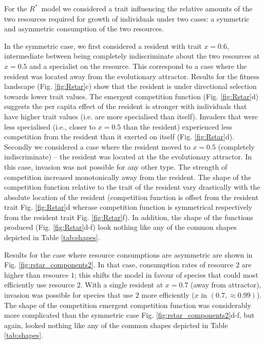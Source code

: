 \documentclass[a4paper,11pt]{article}
\newcommand{\Rstar}{\ensuremath{R^*}}
\begin{document}
For the \Rstar\ model we considered a trait influencing the relative amounts of the two resources required for growth of individuals under two cases: a symmetric and asymmetric consumption of the two resources.

In the symmetric case, we first considered a resident with trait $x = 0.6$, intermediate between being completely indiscriminate about the two resources at $x = 0.5$ and a specialist on the resource. This correspond to a case where the resident was located away from the evolutionary attractor. Results for the fitness landscape (Fig. \ref{fig:Rstar}c) show that the resident is under directional selection towards lower trait values. The emergent competition function (Fig. \ref{fig:Rstar}d) suggests the per capita effect of the resident is stronger with individuals that have higher trait values (i.e. are more specialised than itself). Invaders that were less specialised (i.e., closer to $x = 0.5$ than the resident) experienced less competition from the resident than it exerted on itself (Fig. \ref{fig:Rstar}d). Secondly we considered a case where the resident moved to $x = 0.5$ (completely indiscriminate) -- the resident was located at the the evolutionary attractor.  In this case, invasion was not possible for any other type. The strength of competition increased monotonically away from the resident. The shape of the competition function relative to the trait of the resident vary drastically with the absolute location of the resident (competition function is offset from the resident trait Fig. \ref{fig:Rstar}d wherase competition function is symmetrical respectively from the resident trait Fig. \ref{fig:Rstar}f). In addition, the shape of the functions produced (Fig. \ref{fig:Rstar}d-f) look nothing like any of the common shapes depicted in Table \ref{tab:shapes}.

Results for the case where resource consumptions are asymmetric are shown in Fig. \ref{fig:rstar_components2}. In that case, consumption rates of resource $2$ are higher than resource $1$; this shifts the model in favour of species that could most efficiently use resource $2$. With a single resident at $x = 0.7$ (away from attractor), invasion was possible for species that use $2$ more efficiently ($x$ in $(0.7, \approx 0.99)$). The shape of the competition emergent competition function was considerably more complicated than the symmetric case Fig. \ref{fig:rstar_components2}d-f, but again, looked nothing like any of the common shapes depicted in Table \ref{tab:shapes}.
\end{document}
